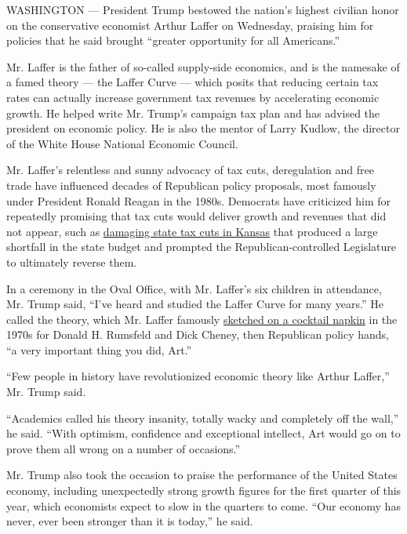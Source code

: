 WASHINGTON --- President Trump bestowed the nation's highest civilian
honor on the conservative economist Arthur Laffer on Wednesday, praising
him for policies that he said brought ``greater opportunity for all
Americans.''

Mr. Laffer is the father of so-called supply-side economics, and is the
namesake of a famed theory --- the Laffer Curve --- which posits that
reducing certain tax rates can actually increase government tax revenues
by accelerating economic growth. He helped write Mr. Trump's campaign
tax plan and has advised the president on economic policy. He is also
the mentor of Larry Kudlow, the director of the White House National
Economic Council.

Mr. Laffer's relentless and sunny advocacy of tax cuts, deregulation and
free trade have influenced decades of Republican policy proposals, most
famously under President Ronald Reagan in the 1980s. Democrats have
criticized him for repeatedly promising that tax cuts would deliver
growth and revenues that did not appear, such as
\href{https://www.npr.org/2017/10/25/560040131/as-trump-proposes-tax-cuts-kansas-deals-with-aftermath-of-experiment}{damaging
state tax cuts in Kansas} that produced a large shortfall in the state
budget and prompted the Republican-controlled Legislature to ultimately
reverse them.

In a ceremony in the Oval Office, with Mr. Laffer's six children in
attendance, Mr. Trump said, ``I've heard and studied the Laffer Curve
for many years.'' He called the theory, which Mr. Laffer famously
\href{https://www.nytimes.com/2017/10/13/us/politics/arthur-laffer-napkin-tax-curve.html}{sketched
on a cocktail napkin} in the 1970s for Donald H. Rumsfeld and Dick
Cheney, then Republican policy hands, ``a very important thing you did,
Art.''

``Few people in history have revolutionized economic theory like Arthur
Laffer,'' Mr. Trump said.

``Academics called his theory insanity, totally wacky and completely off
the wall,'' he said. ``With optimism, confidence and exceptional
intellect, Art would go on to prove them all wrong on a number of
occasions.''

Mr. Trump also took the occasion to praise the performance of the United
States economy, including unexpectedly strong growth figures for the
first quarter of this year, which economists expect to slow in the
quarters to come. ``Our economy has never, ever been stronger than it is
today,'' he said.

